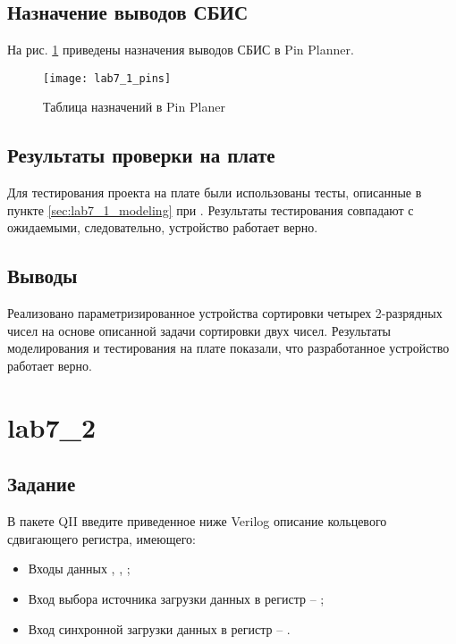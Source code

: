 \subsection{Назначение выводов СБИС}

На рис. \ref{fig:lab7_1_pins} приведены назначения выводов СБИС в Pin Planner.

\begin{figure}[H]
\begin{center}
	\texttt{[image: lab7\_1\_pins]}
	\caption{Таблица назначений в Pin Planer}
	\label{fig:lab7_1_pins}
\end{center}
\end{figure}

\subsection{Результаты проверки на плате}

Для тестирования проекта на плате были использованы тесты, описанные в пункте \ref{sec:lab7_1_modeling} при . Результаты тестирования совпадают с ожидаемыми, следовательно, устройство работает верно.

\subsection{Выводы}

Реализовано параметризированное устройства сортировки четырех 2-разрядных чисел на основе описанной задачи сортировки двух чисел. Результаты моделирования и тестирования на плате показали, что разработанное устройство работает верно.

\newpage

\section{lab7\_2}

\subsection{Задание}

В пакете QII введите приведенное ниже Verilog описание кольцевого сдвигающего регистра, имеющего:
\begin{itemize}
	\item Входы данных , , ;
	\item Вход выбора источника загрузки данных в регистр -- ;
	\item Вход синхронной загрузки данных в регистр -- .
\end{itemize}

